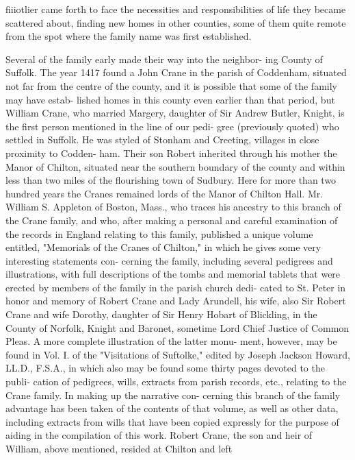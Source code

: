 \documentclass[oneside]{book}
\begin{document}
fiiiotlier came forth to face the necessities and responsibilities of 
life they became scattered about, finding new homes in other 
counties, some of them quite remote from the spot where the 
family name was first established. 

Several of the family early made their way into the neighbor- 
ing County of Suffolk. The year 1417 found a John Crane in 
the parish of Coddenham, situated not far from the centre of the 
county, and it is possible that some of the family may have estab- 
lished homes in this county even earlier than that period, but 
William Crane, who married Margery, daughter of Sir Andrew 
Butler, Knight, is the first person mentioned in the line of our pedi- 
gree (previously quoted) who settled in Suffolk. He was styled 
of Stonham and Creeting, villages in close proximity to Codden- 
ham. Their son Robert inherited through his mother the Manor 
of Chilton, situated near the southern boundary of the county and 
within less than two miles of the flourishing town of Sudbury. 
Here for more than two hundred years the Cranes remained lords 
of the Manor of Chilton Hall. Mr. William S. Appleton of 
Boston, Mass., who traces his ancestry to this branch of the 
Crane family, and who, after making a personal and careful 
examination of the records in England relating to this family, 
published a unique volume entitled, "Memorials of the Cranes of 
Chilton," in which he gives some very interesting statements con- 
cerning the family, including several pedigrees and illustrations, 
with full descriptions of the tombs and memorial tablets that 
were erected by members of the family in the parish church dedi- 
cated to St. Peter in honor and memory of Robert Crane and 
Lady Arundell, his wife, also Sir Robert Crane and wife Dorothy, 
daughter of Sir Henry Hobart of Blickling, in the County of 
Norfolk, Knight and Baronet, sometime Lord Chief Justice of 
Common Pleas. A more complete illustration of the latter monu- 
ment, however, may be found in Vol. I. of the "Visitations of 
Suftolke," edited by Joseph Jackson Howard, LL.D., F.S.A., in 
which also may be found some thirty pages devoted to the publi- 
cation of pedigrees, wills, extracts from parish records, etc., 
relating to the Crane family. In making up the narrative con- 
cerning this branch of the family advantage has been taken of the 
contents of that volume, as well as other data, including extracts 
from wills that have been copied expressly for the purpose of 
aiding in the compilation of this work. Robert Crane, the son 
and heir of William, above mentioned, resided at Chilton and left 
\end{document}
